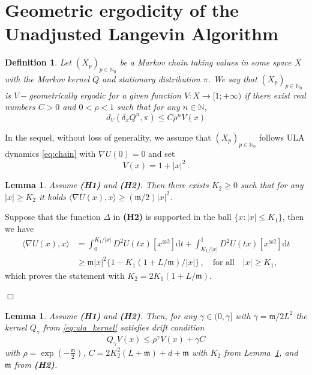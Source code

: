 \documentclass[bj]{imsart}
\newcommand{\ps}[2]{\langle #1, #2 \rangle}
\def\nset{\mathbb{N}}
\def\rmd{\mathrm{d}}
\newcommand{\proofendsign}{$\Box$}
\newtheorem{definition}{Definition}
\newtheorem{lem}[thm]{Lemma}
\newenvironment{proof}{{\noindent \bf Proof }}
 {{\hspace*{\fill}\proofendsign\par\bigskip}}
\def\eqsp{\,}
\begin{document}
\appendix
\section{Geometric ergodicity of the Unadjusted Langevin Algorithm}\label{sec:appendix}


\begin{definition}
\label{def:v_ergodicity}
Let $(X_p)_{p \in \nset_0}$ be a Markov chain taking values in some space $X$ with the Markov kernel $Q$ and stationary distribution $\pi$. We say that $(X_p)_{p \in \nset_0}$ is $V-$geometrically ergodic for a given function $V: X \rightarrow [1; +\infty)$ if there exist real numbers $C > 0$ and $0 < \rho < 1$ such that for any $n \in \nset$,
\begin{equation}
\label{eq:v_ergodicity}
d_V(\delta_xQ^{n},\pi) \leq C\rho^n V(x)
\end{equation}
\end{definition}
In  the sequel, without loss of generality, we assume that $(X_p)_{p \in \nset_0}$ follows ULA dynamics \eqref{eq:chain} with $\nabla U(0)=0$ and  set
\begin{equation}
\label{eq:definition-V}
V(x) = 1 + |x|^2 \eqsp.
\end{equation}
\begin{lem}
  \label{lem:quadratic_behaviour}
  Assume {\bf (H1)} and {\bf (H2)}. Then there exists $K_2 \geq 0$ such that for any $ | x | \geq K_2$ it holds $\ps{\nabla U(x)}{x} \geq (\mathfrak{m}/2) | x |^2$.
\end{lem}
\begin{proof}
 Suppose that the function $\Delta$ in {\bf (H2)} is supported in the ball $\{x:|x|\leq K_1\}$, then we have 
  \begin{align*}
    \ps{\nabla U(x)}{x}
    &= \int_{0}^{K_1/| x |} D^2 U(t x ) [x^{\otimes 2}] \rmd t + \int_{K_1/| x |} ^ 1 D^2 U(t x ) [x^{\otimes 2}] \rmd t\\
    & \geq \mathfrak{m} |x |^2 \{1- K_1 (1 +L/\mathfrak{m})   / | x | \}\eqsp,\quad \mbox{for all} \quad  | x |\geq K_1,
  \end{align*}
which proves the  statement with $K_2=2K_{1}(1+L/\mathfrak{m}).$
\end{proof}
\begin{lem}
\label{lem:drift}
 Assume {\bf (H1)} and {\bf (H2)}.
 Then, for any $\gamma \in (0,\bar{\gamma}]$ with $\overline{\gamma} = \mathfrak{m}/2L^2$  the kernel $Q_\gamma$ from \eqref{eq:ula_kernel} satisfies drift condition
 \begin{equation}
\label{eq:lyapunov}
Q_{\gamma}V(x) \leq \rho^{\gamma} V(x) + \gamma C
\end{equation}
with   $\rho = \exp{\left(-\frac{\mathfrak{m}}{2}\right)}$, $C = 2K_2^2(L+\mathfrak{m}) + d + \mathfrak{m}$ with $K_2$ from Lemma~\ref{lem:quadratic_behaviour}, and $\mathfrak{m}$ from {\bf (H2)}.
\end{lem}
\end{document}
